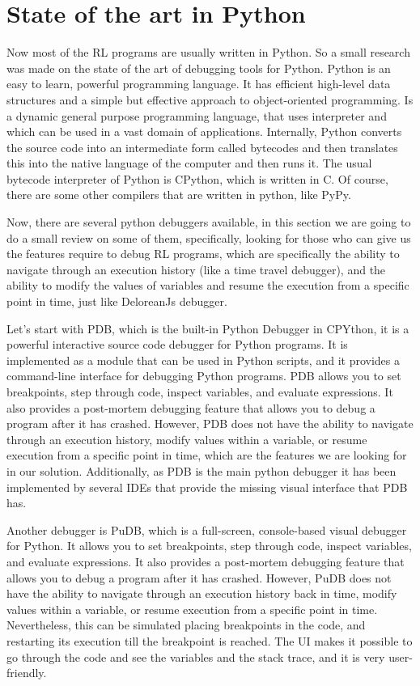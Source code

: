\section{State of the art in Python}
\label{sec:py}
Now most of the \ac{RL} programs are usually written in Python. So a small research was
made on the state of the art of debugging tools for Python. Python is an easy to learn, 
powerful programming language. It has efficient high-level data structures and a simple 
but effective approach to object-oriented programming. Is a dynamic general purpose 
programming language, that uses interpreter and which can be used in a vast domain 
of applications\cite{10.5555/2846189}. Internally, Python converts the source code 
into an intermediate form called bytecodes and then translates this into the native 
language of the computer and then runs it. The usual bytecode interpreter of Python 
is CPython\cite{shaw2021cpython}, which is written in C. Of course, there are some 
other compilers that are written in python, like PyPy.

Now, there are several python debuggers available, in this section we are going to do a 
small review on some of them, specifically, looking for those who can give us the features 
require to debug \ac{RL} programs, which are specifically the ability to navigate through
an execution history (like a time travel debugger), and the ability to modify the values
of variables and resume the execution from a specific point in time, just like 
DeloreanJs\cite{delorean23} debugger.

Let's start with \ac{PDB}\cite{python-pdb}, which is the built-in Python Debugger in CPYthon, it is a 
powerful interactive source code debugger for Python programs. It is implemented as a 
module that can be used in Python scripts, and it provides a command-line interface 
for debugging Python programs. \ac{PDB} allows you to set breakpoints, step through 
code, inspect variables, and evaluate expressions. It also provides a post-mortem 
debugging feature that allows you to debug a program after it has crashed. However, 
\ac{PDB} does not have the ability to navigate through an execution history, modify 
values within a variable, or resume execution from a specific point in time, which 
are the features we are looking for in our solution. Additionally, as \ac{PDB} is the main 
python debugger it has been implemented by several IDEs that provide the missing visual 
interface that \ac{PDB} has.

Another debugger is PuDB\cite{pudb}, which is a full-screen, console-based visual 
debugger for Python. It allows you to set breakpoints, step through code, inspect 
variables, and evaluate expressions. It also provides a post-mortem debugging feature 
that allows you to debug a program after it has crashed. However, PuDB does not 
have the ability to navigate through an execution history back in time, modify values 
within a variable, or resume execution from a specific point in time. Nevertheless, this 
can be simulated placing breakpoints in the code, and restarting its execution till the 
breakpoint is reached. The UI makes it possible to go through the code and see the 
variables and the stack trace, and it is very user-friendly.

